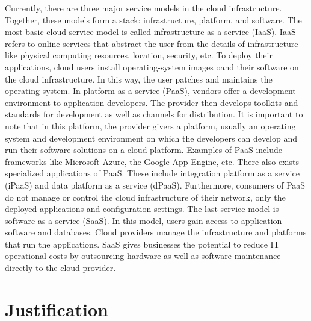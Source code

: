 \documentclass[a4paper, 8pt]{article} %
\begin{document}
Currently, there are three major service models in the cloud infrastructure.  Together, these models form a stack: infrastructure, platform, and software.  The most basic cloud service model is called infrastructure as a service (IaaS).  IaaS refers to online services that abstract the user from the details of infrastructure like physical computing resources, location, security, etc.  To deploy their applications, cloud users install operating-system images oand their software on the cloud infrastructure.  In this way, the user patches and maintains the operating system.  In platform as a service (PaaS), vendors offer a development environment to application developers.  The provider then develops toolkits and standards for development as well as channels for distribution.  It is important to note that in this platform, the provider givers a platform, usually an operating system and development environment on which the developers can develop and run their software solutions on a cloud platform.  Examples of PaaS include frameworks like Microsoft Azure, the Google App Engine, etc.  There also exists specialized applications of PaaS.  These include integration platform as a service (iPaaS) and data platform as a service (dPaaS).  Furthermore, consumers of PaaS do not manage or control the cloud infrastructure of their network, only the deployed applications and configuration settings.  The last service model is software as a service (SaaS).  In this model, users gain access to application software and databases.  Cloud providers manage the infrastructure and platforms that run the applications.  SaaS gives businesses the potential to reduce IT operational costs by outsourcing hardware as well as software maintenance directly to the cloud provider.  

\section*{Justification}
\end{document}
